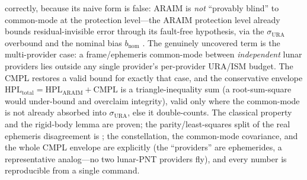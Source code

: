 correctly, because its naive form is false: ARAIM is \emph{not} ``provably blind'' to
common-mode at the protection level---the ARAIM protection level already bounds
residual-invisible error through its fault-free hypothesis, via the $\sigma_{\mathrm
{URA}}$ overbound and the nominal bias $b_{\mathrm{nom}}$
\citep{blanch2015,wgc2016araim}. The genuinely uncovered term is the multi-provider
case: a frame/ephemeris common-mode between \emph{independent} lunar providers lies
outside any single provider's per-provider URA/ISM budget. The CMPL restores a valid
bound for exactly that case, and the conservative envelope
$\mathrm{HPL}_{\mathrm{total}}=\mathrm{HPL}_{\mathrm{ARAIM}}+\mathrm{CMPL}$ is a
triangle-inequality sum (a root-sum-square would under-bound and overclaim integrity),
valid only where the common-mode is not already absorbed into $\sigma_{\mathrm{URA}}$,
else it double-counts. The classical property and the rigid-body lemma are proven; the
parity/least-squares split of the real ephemeris disagreement is \Validated{}; the
constellation, the common-mode covariance, and the whole CMPL envelope are explicitly
\Modelled{} (the ``providers'' are ephemerides, a representative analog---no two
lunar-PNT providers fly), and every number is reproducible from a single command.

